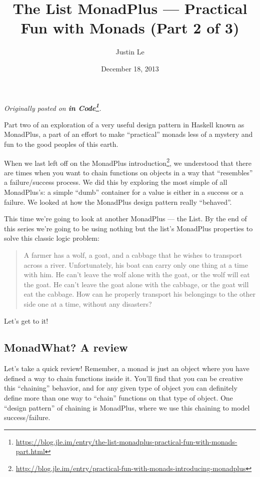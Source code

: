 \documentclass[]{article}
\title{The List MonadPlus --- Practical Fun with Monads (Part 2 of 3)}
\author{Justin Le}
\date{December 18, 2013}
\renewcommand{\href}[2]{#2\footnote{\url{#1}}}
\begin{document}
\maketitle

\emph{Originally posted on
\textbf{\href{https://blog.jle.im/entry/the-list-monadplus-practical-fun-with-monads-part.html}{in
Code}}.}

Part two of an exploration of a very useful design pattern in Haskell known as
MonadPlus, a part of an effort to make ``practical'' monads less of a mystery
and fun to the good peoples of this earth.

When we last left off on the
\href{http://blog.jle.im/entry/practical-fun-with-monads-introducing-monadplus}{MonadPlus
introduction}, we understood that there are times when you want to chain
functions on objects in a way that ``resembles'' a failure/success process. We
did this by exploring the most simple of all MonadPlus's: a simple ``dumb''
container for a value is either in a success or a failure. We looked at how the
MonadPlus design pattern really ``behaved''.

This time we're going to look at another MonadPlus --- the List. By the end of
this series we're going to be using nothing but the list's MonadPlus properties
to solve this classic logic problem:

\begin{quote}
A farmer has a wolf, a goat, and a cabbage that he wishes to transport across a
river. Unfortunately, his boat can carry only one thing at a time with him. He
can't leave the wolf alone with the goat, or the wolf will eat the goat. He
can't leave the goat alone with the cabbage, or the goat will eat the cabbage.
How can he properly transport his belongings to the other side one at a time,
without any disasters?
\end{quote}

Let's get to it!

\subsection{MonadWhat? A review}\label{monadwhat-a-review}

Let's take a quick review! Remember, a monad is just an object where you have
defined a way to chain functions inside it. You'll find that you can be creative
this ``chaining'' behavior, and for any given type of object you can definitely
define more than one way to ``chain'' functions on that type of object. One
``design pattern'' of chaining is MonadPlus, where we use this chaining to model
success/failure.
\end{document}
